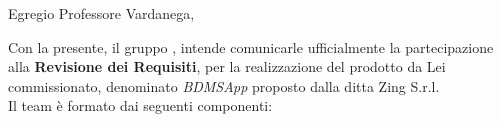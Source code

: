 \documentclass[10pt,a4paper,sans]{moderncv}        %
\begin{document}
\date{\emph{2015-01-23}}
\opening{Egregio Professore Vardanega,}
\makelettertitle

Con la presente, il gruppo \groupName{}, intende comunicarle ufficialmente la partecipazione alla \textbf{Revisione dei Requisiti}, per la realizzazione del prodotto da Lei commissionato, denominato \textit{BDMSApp} proposto dalla ditta Zing S.r.l.\\
Il team è formato dai seguenti componenti: 
\end{document}
